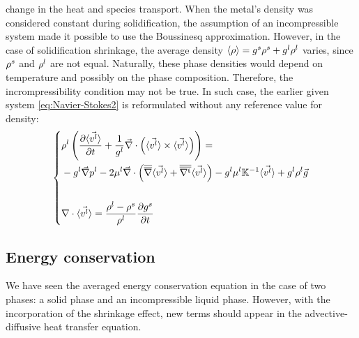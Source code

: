 change in the heat and species transport.
%
%
When the metal's density was considered constant during solidification, the assumption of an incompressible system made it possible to
use the Boussinesq approximation. However, in the case of solidification shrinkage, the average density $\langle  \rho  \rangle = {g^s} \rho^s + {g^l} \rho^l $
varies, since $\rho^s$ and $\rho^l$ are not equal. Naturally, these phase densities would depend on temperature and possibly on the phase composition. 
Therefore, the incrompressibility condition may not be true. In such case, the earlier given system \cref{eq:Navier-Stokes2} is reformulated without 
any reference value for density:
\begin{equation}
\label{eq:momentum_balance_metal}
   \left\{
   \begin{aligned}
      & \rho^l \left( \frac{\partial  \langle \vec{v^l} \rangle }{\partial t}  + \frac{1}{{g^l}} \vec{\nabla} \cdot \left( \langle \vec{v^l} \rangle \times \langle \vec{v^l} \rangle \right) \right) = \\
	  &- {g^l}\vec{\nabla} {p^l} - 2 \mu^l \vec{\nabla} \cdot \left( {\overline{\overline{\nabla}}} \langle \vec{v^l} \rangle + {\overline{\overline{\nabla^\text{t}}}} \langle \vec{v^l} \rangle \right)
	  - {g^l} \mu^l \mathbb{K}^{-1} \langle \vec{v^l} \rangle + {g^l} \rho^l \vec{g}\\ \\
      & \nabla \cdot \langle \vec{v^l} \rangle =  \frac{\rho^l-\rho^s}{\rho^l} \frac{\partial {g^s}}{\partial t} 
    \end{aligned}
    \right.
\end{equation}
\subsection{Energy conservation}
We have seen the averaged energy conservation equation in the case of two phases: 
a solid phase and an incompressible liquid phase. However, with the incorporation of
the shrinkage effect, new terms should appear in the advective-diffusive heat transfer equation. 

